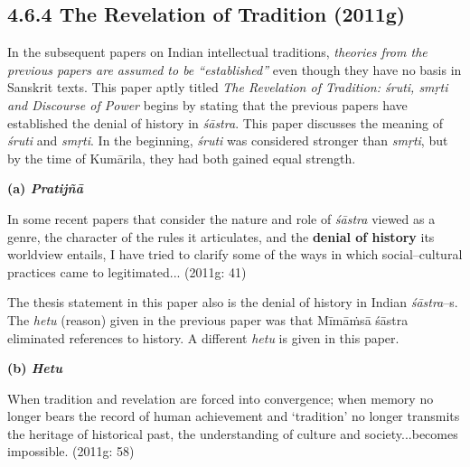 \newpage

\subsection*{4.6.4 The Revelation of Tradition (2011g)}

\vspace{-.3cm}

In the subsequent papers on Indian intellectual traditions, \textit{theories from the previous papers are assumed to be “established”} even though they have no basis in Sanskrit texts. This paper aptly titled \textit{The Revelation of Tradition: śruti, smṛti and Discourse of Power} begins by stating that the previous papers have established the denial of history in \textit{śāstra}. This paper discusses the meaning of \textit{śruti} and \textit{smṛti}. In the beginning, \textit{śruti} was considered stronger than \textit{smṛti}, but by the time of Kumārila, they had both gained equal strength.

\textbf{(a) \textit{Pratijñā}}

\begin{myquote}
In some recent papers that consider the nature and role of \textit{śāstra }viewed as a genre, the character of the rules it articulates, and the \textbf{denial of history} its worldview entails, I have tried to clarify some of the ways in which social–cultural practices came to legitimated... (2011g: 41)
\end{myquote}

The thesis statement in this paper also is the denial of history in Indian \textit{śāstra}–s. The \textit{hetu} (reason) given in the previous paper was that Mīmāṁsā śāstra eliminated references to history. A different \textit{hetu} is given in this paper.

\vspace{.15cm}

\textbf{(b) \textit{Hetu}}

\begin{myquote}
When tradition and revelation are forced into convergence; when memory no longer bears the record of human achievement and ‘tradition’ no longer transmits the heritage of historical past, the understanding of culture and society...becomes impossible. (2011g: 58)
\end{myquote}

